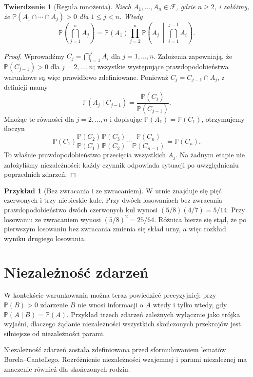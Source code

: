 \documentclass[11pt,a4paper,oneside]{report}
\numberwithin{equation}{chapter}
\theoremstyle{plain}
\newtheorem{twierdzenie}{Twierdzenie}[chapter]
\theoremstyle{definition}
\newtheorem{przyklad}{Przykład}[chapter]
\theoremstyle{remark}
\newcommand{\Prob}{\mathbb{P}}
\begin{document}
\begin{twierdzenie}[Reguła mnożenia]
Niech $A_1,\ldots,A_n\in\mathcal F$, gdzie $n\geq2$, i załóżmy,
że $\Prob(A_1\cap\cdots\cap A_{j})>0$ dla $1\leq j<n$.
Wtedy
\[
\Prob\!\left(\bigcap_{j=1}^n A_j\right)
=\Prob(A_1)\prod_{j=2}^n
\Prob\!\left(A_j\,\middle|\,\bigcap_{i=1}^{j-1}A_i\right).
\]
\end{twierdzenie}
\begin{proof}
Wprowadźmy $C_j=\bigcap_{i=1}^j A_i$ dla
$j=1,\ldots,n$. Założenia zapewniają,
że $\Prob(C_{j-1})>0$ dla $j=2,\ldots,n$;
wszystkie występujące prawdopodobieństwa warunkowe
są więc prawidłowo zdefiniowane. Ponieważ
$C_j=C_{j-1}\cap A_j$, z definicji mamy
\[
\Prob(A_j\mid C_{j-1})
=\frac{\Prob(C_j)}{\Prob(C_{j-1})}.
\]
Mnożąc te równości dla $j=2,\ldots,n$ i dopisując
$\Prob(A_1)=\Prob(C_1)$, otrzymujemy iloczyn
\[
\Prob(C_1)\frac{\Prob(C_2)}{\Prob(C_1)}
\frac{\Prob(C_3)}{\Prob(C_2)}\cdots
\frac{\Prob(C_n)}{\Prob(C_{n-1})}=\Prob(C_n).
\]
To właśnie prawdopodobieństwo przecięcia wszystkich $A_j$.
Na żadnym etapie nie założyliśmy niezależności:
każdy czynnik odpowiada sytuacji po uwzględnieniu
poprzednich zdarzeń.
\end{proof}

\begin{przyklad}[Bez zwracania i ze zwracaniem]
W urnie znajduje się pięć czerwonych i trzy niebieskie kule.
Przy dwóch losowaniach bez zwracania prawdopodobieństwo dwóch
czerwonych kul wynosi $(5/8)(4/7)=5/14$.
Przy losowaniu ze zwracaniem wynosi $(5/8)^2=25/64$.
Różnica bierze się stąd, że po pierwszym losowaniu bez zwracania
zmienia się skład urny, a więc rozkład wyniku drugiego losowania.
\end{przyklad}

\section{Niezależność zdarzeń}
W kontekście warunkowania można teraz powiedzieć precyzyjniej:
przy $\Prob(B)>0$ zdarzenie $B$ nie wnosi informacji o $A$
wtedy i tylko wtedy, gdy $\Prob(A\mid B)=\Prob(A)$.
Przykład trzech zdarzeń zależnych wyłącznie jako trójka
wyjaśni, dlaczego żądanie niezależności wszystkich skończonych
przekrojów jest silniejsze od niezależności parami.

Niezależność zdarzeń została zdefiniowana przed sformułowaniem
lematów Borela--Cantellego. Rozróżnienie niezależności wzajemnej
i parami niezależnej ma znaczenie również dla skończonych rodzin.
\end{document}
